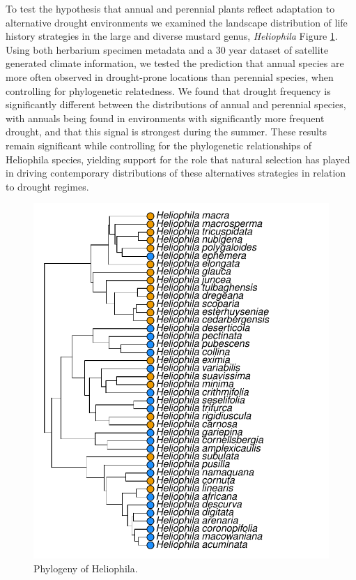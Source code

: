\documentclass[man,floatsintext]{apa6}
\theoremstyle{definition}
\theoremstyle{definition}
\theoremstyle{definition}
\theoremstyle{remark}
\begin{document}
To test the hypothesis that annual and perennial plants reflect
adaptation to alternative drought environments we examined the landscape
distribution of life history strategies in the large and diverse mustard
genus, \emph{Heliophila} Figure \ref{fig:phylogeny}. Using both
herbarium specimen metadata and a 30 year dataset of satellite generated
climate information, we tested the prediction that annual species are
more often observed in drought-prone locations than perennial species,
when controlling for phylogenetic relatedness. We found that drought
frequency is significantly different between the distributions of annual
and perennial species, with annuals being found in environments with
significantly more frequent drought, and that this signal is strongest
during the summer. These results remain significant while controlling
for the phylogenetic relationships of Heliophila species, yielding
support for the role that natural selection has played in driving
contemporary distributions of these alternatives strategies in relation
to drought regimes.



\begin{figure}[!h]
\includegraphics[width=\textwidth]{../figures/phylogeny} \caption{Phylogeny of Heliophila.}\label{fig:phylogeny}
\end{figure}
\end{document}
